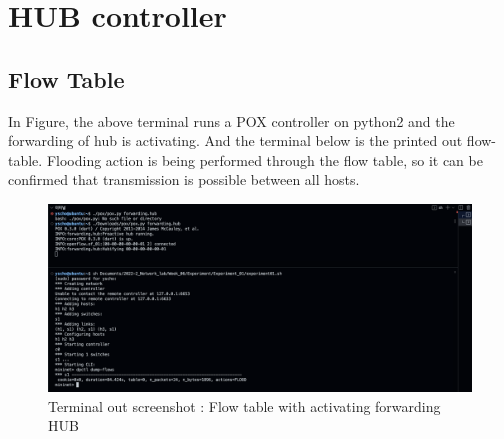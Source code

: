 \section{HUB controller}



\subsection{Flow Table}
In Figure, the above terminal runs a POX controller on python2 and the forwarding of hub is activating. And the terminal below is the printed out flow-table.
Flooding action is being performed through the flow table, so it can be confirmed that transmission is possible between all hosts.\\
\vspace{-4mm}
\begin{figure}[!h]\centering 
	\includegraphics[width=.99\textwidth]{image/week06/2-1.png}
	\caption{\footnotesize 
	Terminal out screenshot : Flow table with activating forwarding HUB}
	\vspace{-10pt}
\end{figure}
\vspace{-8mm}
